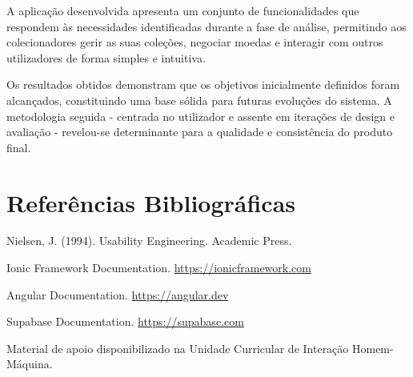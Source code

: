 \documentclass[12pt,a4paper]{article}
\begin{document}
A aplicação desenvolvida apresenta um conjunto de funcionalidades que respondem às necessidades identificadas durante a fase de análise, permitindo aos colecionadores gerir as suas coleções, negociar moedas e interagir com outros utilizadores de forma simples e intuitiva.

Os resultados obtidos demonstram que os objetivos inicialmente definidos foram alcançados, constituindo uma base sólida para futuras evoluções do sistema. A metodologia seguida - centrada no utilizador e assente em iterações de design e avaliação - revelou-se determinante para a qualidade e consistência do produto final.

\section{Referências Bibliográficas}

Nielsen, J. (1994). Usability Engineering. Academic Press.

Ionic Framework Documentation. \url{https://ionicframework.com}

Angular Documentation. \url{https://angular.dev}

Supabase Documentation. \url{https://supabase.com}

Material de apoio disponibilizado na Unidade Curricular de Interação Homem-Máquina.
\end{document}
